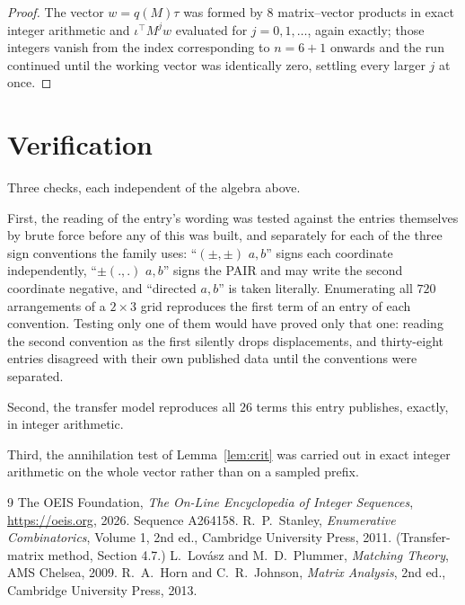 \documentclass[11pt,a4paper]{article}
\theoremstyle{plain}
\theoremstyle{definition}
\begin{document}
\begin{proof}
The vector $w=q(M)\tau$ was formed by $8$ matrix--vector products in exact integer
arithmetic and $\iota^{\!\top}M^{j}w$ evaluated for $j=0,1,\dots$, again exactly; those
integers vanish from the index corresponding to $n=6+1$ onwards and the run continued
until the working vector was identically zero, settling every larger $j$ at once.
\end{proof}

\section{Verification}

Three checks, each independent of the algebra above.

First, the reading of the entry's wording was tested against the entries themselves by brute
force before any of this was built, and separately for each of the three sign conventions the
family uses: ``$(\pm,\pm)$ $a,b$'' signs each coordinate independently, ``$\pm(.,.)$ $a,b$''
signs the PAIR and may write the second coordinate negative, and ``directed $a,b$'' is taken
literally. Enumerating all $720$ arrangements of a $2\times3$ grid reproduces the first term
of an entry of each convention. Testing only one of them would have proved only that one:
reading the second convention as the first silently drops displacements, and thirty-eight
entries disagreed with their own published data until the conventions were separated.

Second, the transfer model reproduces all $26$ terms this entry publishes, exactly, in
integer arithmetic.

Third, the annihilation test of Lemma~\ref{lem:crit} was carried out in exact integer
arithmetic on the whole vector rather than on a sampled prefix.

\begin{thebibliography}{9}
 The OEIS Foundation, \emph{The On-Line Encyclopedia of Integer
Sequences}, \url{https://oeis.org}, 2026. Sequence A264158.
 R.~P.~Stanley, \emph{Enumerative Combinatorics}, Volume 1, 2nd ed.,
Cambridge University Press, 2011. (Transfer-matrix method, Section 4.7.)
 L.~Lov\'asz and M.~D.~Plummer, \emph{Matching Theory}, AMS Chelsea, 2009.
 R.~A.~Horn and C.~R.~Johnson, \emph{Matrix Analysis}, 2nd ed., Cambridge
University Press, 2013.
\end{thebibliography}
\end{document}
